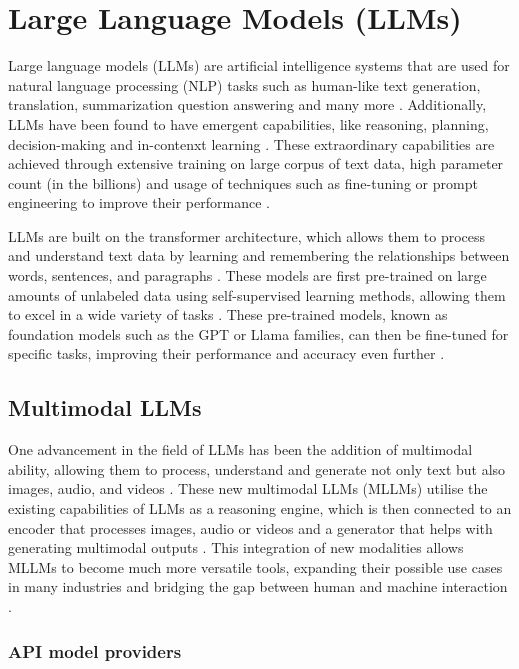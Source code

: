 \section{Large Language Models (LLMs)}

Large language models (LLMs) are artificial intelligence systems that are used for natural language processing (NLP) tasks such as human-like text generation, translation, summarization question answering and many more \parencite{llm2,llm_healthcare}. Additionally, LLMs have been found to have emergent capabilities, like reasoning, planning, decision-making and in-contenxt learning \parencite{llm2}. These extraordinary capabilities are achieved through extensive training on large corpus of text data, high parameter count (in the billions) and usage of techniques such as fine-tuning or prompt engineering to improve their performance \parencite{llm2,llm_healthcare}.

LLMs are built on the transformer architecture, which allows them to process and understand text data by learning and remembering the relationships between words, sentences, and paragraphs \parencite{llm}. These models are first pre-trained on large amounts of unlabeled data using self-supervised learning methods, allowing them to excel in a wide variety of tasks \parencite{foundation, llm2}. These pre-trained models, known as foundation models such as the GPT or Llama families, can then be fine-tuned for specific tasks, improving their performance and accuracy even further \parencite{gpt4,llama3,llm2}.

\subsection{Multimodal LLMs}

One advancement in the field of LLMs has been the addition of multimodal ability, allowing them to process, understand and generate not only text but also images, audio, and videos \parencite{mllm, mllm2}. These new multimodal LLMs (MLLMs) utilise the existing capabilities of LLMs as a reasoning engine, which is then connected to an encoder that processes images, audio or videos and a generator that helps with generating multimodal outputs \parencite{mllm}. This integration of new modalities allows MLLMs to become much more versatile tools, expanding their possible use cases in many industries and bridging the gap between human and machine interaction \parencite{llm_healthcare}.

\subsubsection{API model providers}

